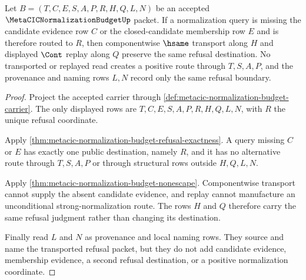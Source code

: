 \begin{theorem}
\label{thm:metacic-normalization-budget-refusal-transport}
Let $B=(T,C,E,S,A,P,R,H,Q,L,N)$ be an accepted $\MetaCICNormalizationBudgetUp$ packet. If a normalization query is missing the candidate evidence row $C$ or the closed-candidate membership row $E$ and is therefore routed to $R$, then componentwise $\hsame$ transport along $H$ and displayed $\Cont$ replay along $Q$ preserve the same refusal destination. No transported or replayed read creates a positive route through $T,S,A,P$, and the provenance and naming rows $L,N$ record only the same refusal boundary.
\end{theorem}
\begin{proof}
Project the accepted carrier through \autoref{def:metacic-normalization-budget-carrier}. The only displayed rows are $T,C,E,S,A,P,R,H,Q,L,N$, with $R$ the unique refusal coordinate.

Apply \autoref{thm:metacic-normalization-budget-refusal-exactness}. A query missing $C$ or $E$ has exactly one public destination, namely $R$, and it has no alternative route through $T,S,A,P$ or through structural rows outside $H,Q,L,N$.

Apply \autoref{thm:metacic-normalization-budget-nonescape}. Componentwise transport cannot supply the absent candidate evidence, and replay cannot manufacture an unconditional strong-normalization route. The rows $H$ and $Q$ therefore carry the same refusal judgment rather than changing its destination.

Finally read $L$ and $N$ as provenance and local naming rows. They source and name the transported refusal packet, but they do not add candidate evidence, membership evidence, a second refusal destination, or a positive normalization coordinate.
\end{proof}

